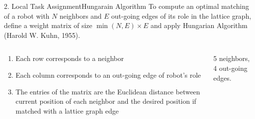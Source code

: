 \documentclass[10pt]{beamer}
\begin{document}
\begin{frame}{2. Local Task Assignment}{Hungarain Algorithm}
  To compute an optimal matching of a robot with $N$ neighbors and $E$
  out-going edges of its role in the lattice graph, define a weight
  matrix of size $\min(N,E) \times E$ and apply
  \textcolor{scred}{Hungarian Algorithm} (Harold W. Kuhn, 1955).
    \begin{columns}[T] %
      \begin{column}{.45\textwidth}
        \begin{enumerate}
        \item \small{Each row corresponds to a neighbor}
        \item \small{Each column corresponds to an out-going edge of robot's role}
        \item \small{The entries of the matrix are the Euclidean distance
          between current position of each neighbor and the desired
          position if matched with a lattice graph edge}
        \end{enumerate}
      \end{column}%
      \begin{column}{.45\textwidth}
        \vspace{3mm}
        
        \vspace{3mm}
        \begin{flushleft}
          \footnotesize{5 neighbors, 4 out-going edges.}
        \end{flushleft}
      \end{column}%
    \end{columns}
\end{frame}
\end{document}
